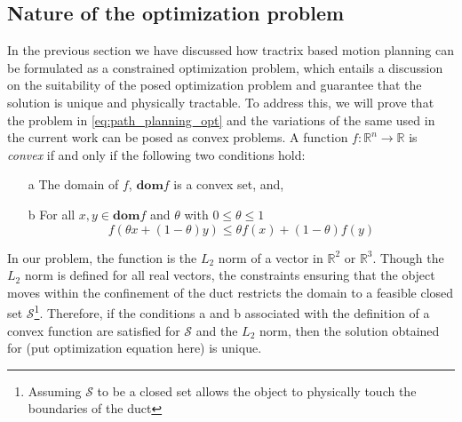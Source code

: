 \documentclass[12pt,a4]{article}
\begin{document}
\subsection{Nature of the optimization problem}\label{sc:optimization}
In the previous section we have discussed how tractrix based motion planning can be formulated as a constrained optimization problem, which entails a discussion on the suitability of the posed optimization problem and guarantee that the solution is unique and physically tractable. To address this, we will prove that the problem in \cref{eq:path_planning_opt} and the variations of the same used in the current work can be posed as convex problems. A function $f:\mathbb{R}^n\to \mathbb{R}$ is \textit{convex} if and only if the following two conditions hold:
\begin{enumerate}
	\item [a] The domain of $f$, $\textbf{dom}f$ is a convex set, and,
	\item [b]  For all $x,y \in \textbf{dom}f$ and $\theta$ with $0\leq \theta \leq 1$ \begin{equation}\label{eq:convex_fn}
	f(\theta x+(1-\theta)y)\leq \theta f(x)+(1-\theta)f(y)
	\end{equation}
\end{enumerate}
In our problem, the function is the $L_2$ norm of a vector in $\mathbb{R}^2$ or $\mathbb{R}^3$.  Though the $L_2$ norm is defined for all real vectors, the constraints ensuring that the object moves within the confinement of the duct restricts the domain to a feasible closed set $\mathcal{S}$\footnote{Assuming $\mathcal{S}$ to be a closed set allows the object to physically touch the boundaries of the duct}. Therefore, if the conditions a and b associated with the definition of a convex function are satisfied for $\mathcal{S}$ and the $L_2$ norm, then the solution obtained for (put optimization equation here) is unique. \\ 
\end{document}
